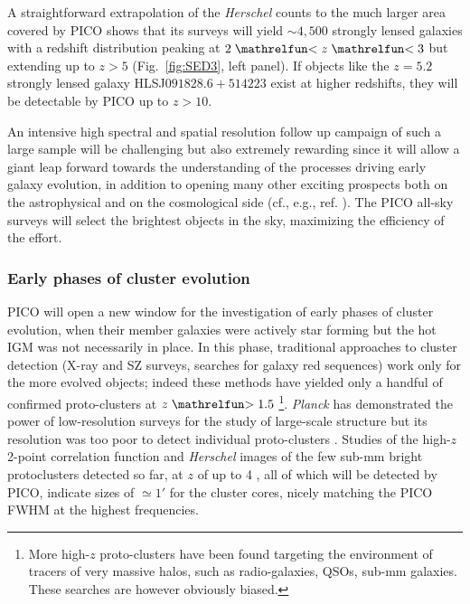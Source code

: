 \documentclass[PICOReport.tex]{subfiles}
\begin{document}
A straightforward extrapolation of the \textit{Herschel} counts to the much larger area covered by PICO shows that its surveys will yield $\sim 4,500$ strongly lensed galaxies with a redshift distribution peaking at $2\simlt z \simlt 3$ \cite{Negrello2017lensed} but extending up to $z> 5$ (Fig.~\ref{fig:SED3}, left panel). If objects like the $z=5.2$ strongly lensed galaxy HLSJ$091828.6+514223$ exist at higher redshifts, they will be detectable by PICO up to $z>10$.

An intensive high spectral and spatial resolution follow up campaign of such a large sample will be challenging but also extremely rewarding since it will allow a giant leap forward towards the understanding of the processes driving early galaxy evolution, in addition to opening many other exciting prospects both on the astrophysical and on the cosmological side (cf., e.g., ref. \cite{Treu2010}). The PICO all-sky surveys will select the brightest objects in the sky, maximizing the efficiency of the effort.

\subsubsection{Early phases of cluster evolution}

PICO will open a new window for the investigation of early phases of cluster evolution, when their member galaxies were actively star forming but the hot IGM was not necessarily in place. In this phase, traditional approaches to cluster detection (X-ray and SZ surveys, searches for galaxy red sequences) work only for the more evolved objects; indeed these methods have yielded only a handful of confirmed proto-clusters at $z\simgt 1.5$ \cite{Overzier2016}\footnote{More high-$z$ proto-clusters have been found targeting the environment of tracers of very massive halos, such as radio-galaxies, QSOs, sub-mm galaxies. These searches are however obviously biased.}.
\textit{Planck} has demonstrated the power of low-resolution surveys for the study of large-scale structure  \cite{Planck2016high_z} but its resolution was too poor to detect individual proto-clusters \cite{Negrello2017protocl}.  Studies of the high-$z$ 2-point correlation function \cite{Chen2016, Negrello2017protocl} and \textit{Herschel} images of the few sub-mm bright protoclusters detected so far, at $z$ of up to 4 \cite{Ivison2013, Wang2016, Oteo2018}, all of which will be detected by PICO, indicate sizes of $\simeq 1'$ for the cluster cores, nicely matching the PICO FWHM at the highest frequencies.
\end{document}
